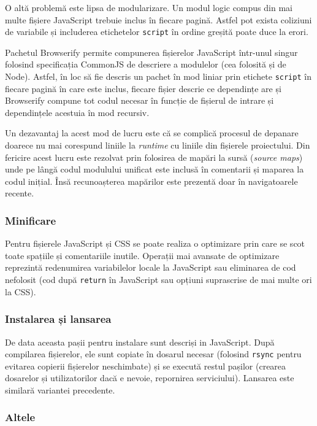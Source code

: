 \documentclass[a4wide,12pt]{report}
\newcommand{\eng}[1]{\emph{#1}} %
\newcommand{\cod}[1]{\texttt{#1}}
\begin{document}
O altă problemă este lipsa de modularizare. Un modul logic compus din mai multe
fișiere JavaScript trebuie inclus în fiecare pagină. Astfel pot exista coliziuni
de variabile și includerea etichetelor \cod{script} în ordine greșită poate duce
la erori.

Pachetul Browserify permite compunerea fișierelor JavaScript într-unul singur
folosind specificația CommonJS de descriere a modulelor (cea folosită și de
Node). Astfel, în loc să fie descris un pachet în mod liniar prin etichete
\cod{script} în fiecare pagină în care este inclus, fiecare fișier descrie ce
dependințe are și Browserify compune tot codul necesar în funcție de fișierul de
intrare și dependințele acestuia în mod recursiv.

Un dezavantaj la acest mod de lucru este că se complică procesul de depanare
doarece nu mai corespund liniile la \eng{runtime} cu liniile din fișierele
proiectului. Din fericire acest lucru este rezolvat prin folosirea de mapări la
sursă (\eng{source maps}) unde pe lângă codul modulului unificat este inclusă în
comentarii și maparea la codul inițial. Însă recunoașterea mapărilor este
prezentă doar în navigatoarele recente.

\subsubsection{Minificare}

Pentru fișierele JavaScript și CSS se poate realiza o optimizare prin care se
scot toate spațiile și comentariile inutile. Operații mai avansate de optimizare
reprezintă redenumirea variabilelor locale la JavaScript sau eliminarea de cod
nefolosit (cod după \cod{return} în JavaScript sau opțiuni suprascrise de mai
multe ori la CSS).

\subsubsection{Instalarea și lansarea}

De data aceasta pașii pentru instalare sunt descriși in JavaScript. După
compilarea fișierelor, ele sunt copiate în dosarul necesar (folosind \cod{rsync}
pentru evitarea copierii fișierelor neschimbate) și se execută restul pașilor
(crearea dosarelor și utilizatorilor dacă e nevoie, repornirea serviciului).
Lansarea este similară variantei precedente.

\subsubsection{Altele}
\end{document}
